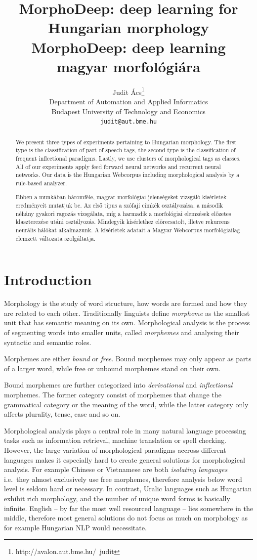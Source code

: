 \documentclass{article}
\title{MorphoDeep: deep learning for Hungarian morphology\\MorphoDeep: deep learning magyar morfol\'ogi\'ara}
\author{
  Judit \'Acs\thanks{http://avalon.aut.bme.hu/~judit} \\
  Department of Automation and Applied Informatics \\
  Budapest University of Technology and Economics\\
  \texttt{judit@aut.bme.hu} \\
}
\begin{document}
\maketitle

\begin{abstract}
    We present three types of experiments pertaining to Hungarian morphology.
    The first type is the classification of part-of-speech tags, the second type is the classification of frequent inflectional paradigms.
    Lastly, we use clusters of morphological tags as classes.
    All of our experiments apply feed forward neural networks and recurrent neural networks.
    Our data is the Hungarian Webcorpus including morphological analysis by a rule-based analyzer.

    Ebben a munkában háromféle, magyar morfológiai jelenségeket vizsgáló kísérletek eredményeit mutatjuk be.
    Az első típus a szófaji címkék osztályozása, a második néhány gyakori ragozás vizsgálata, míg a harmadik a morfológiai elemzések előzetes klaszterezése utáni osztályozás.
    Mindegyik kísérlethez előrecsatolt, illetve rekurrens neurális hálókat alkalmazunk.
    A kísérletek adatait a Magyar Webcorpus morfológiailag elemzett változata szolgáltatja.
\end{abstract}

\section{Introduction}\label{sec:introduction}

Morphology is the study of word structure, how words are formed and how they are related to each other.
Traditionally linguists define \emph{morpheme} as the smallest unit that has semantic meaning on its own.
Morphological analysis is the process of segmenting words into smaller units, called \emph{morphemes} and analysing their syntactic and semantic roles.

Morphemes are either \emph{bound} or \emph{free}.
Bound morphemes may only appear as parts of a larger word, while free or unbound morphemes stand on their own.

Bound morphemes are further categorized into \emph{derivational} and \emph{inflectional} morphemes.
The former category consist of morphemes that change the grammatical category or the meaning of the word, while the latter category only affects plurality, tense, case and so on.

Morphological analysis plays a central role in many natural language processing tasks such as information retrieval, machine translation or spell checking.
However, the large variation of morphological paradigms accross different languages makes it especially hard to create general solutions for morphological analysis.
For example Chinese or Vietnamese are both \emph{isolating languages} i.e.~they almost exclusively use free morphemes, therefore analysis below word level is seldom hard or necessary.
In contrast, Uralic languages such as Hungarian exhibit rich morphology, and the number of unique word forms is basically infinite.
English -- by far the most well resourced language -- lies somewhere in the middle, therefore most general solutions do not focus as much on morphology as for example Hungarian NLP would necessitate.
\end{document}
